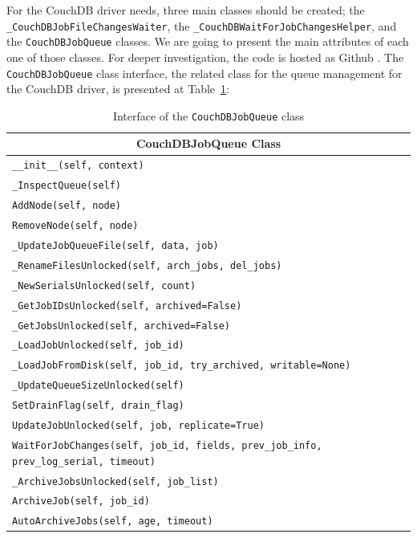 \begin{description}
    For the CouchDB driver needs, three main classes should be created; the
    \texttt{\_CouchDBJobFileChangesWaiter}, the
    \texttt{\_CouchDBWaitForJobChangesHelper}, and the \texttt{CouchDBJobQueue}
    classes. We are going to present the main attributes of each one of those
    classes. For deeper investigation, the code is hosted as Github
    . The \texttt{CouchDBJobQueue}
    class interface, the related class for the queue management for the CouchDB
    driver, is presented at Table~\ref{tbl:couch_jqueue}:

    \begin{table}[htbp]
      \begin{center}
      \begin{tabular}{l}
        \hline
        \multicolumn{1}{c}{\textbf{CouchDBJobQueue Class}} \\
        \hline\hline
        \texttt{\_\_init\_\_(self, context)} \\
        \texttt{\_InspectQueue(self)} \\
        \texttt{AddNode(self, node)} \\
        \texttt{RemoveNode(self, node)} \\
        \texttt{\_UpdateJobQueueFile(self, data, job)} \\
        \texttt{\_RenameFilesUnlocked(self, arch\_jobs, del\_jobs)} \\
        \texttt{\_NewSerialsUnlocked(self, count)} \\
        \texttt{\_GetJobIDsUnlocked(self, archived=False)} \\
        \texttt{\_GetJobsUnlocked(self, archived=False)} \\
        \texttt{\_LoadJobUnlocked(self, job\_id)} \\
        \texttt{\_LoadJobFromDisk(self, job\_id, try\_archived,
            writable=None)} \\
        \texttt{\_UpdateQueueSizeUnlocked(self)} \\
        \texttt{SetDrainFlag(self, drain\_flag)} \\
        \texttt{UpdateJobUnlocked(self, job, replicate=True)} \\
        \texttt{WaitForJobChanges(self, job\_id, fields, prev\_job\_info,
            prev\_log\_serial, timeout)} \\
        \texttt{\_ArchiveJobsUnlocked(self, job\_list)} \\
        \texttt{ArchiveJob(self, job\_id)} \\
        \texttt{AutoArchiveJobs(self, age, timeout)} \\
        \hline
      \end{tabular}
      \end{center}
      \caption{Interface of the \texttt{CouchDBJobQueue} class
        \label{tbl:couch_jqueue}}
    \end{table}


\end{description}
